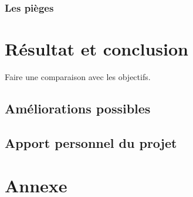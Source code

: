 \documentclass[12pt]{report}
\begin{document}
		\subsection{Les pièges}

\chapter{Résultat et conclusion}

	Faire une comparaison avec les objectifs.
	
	\section{Améliorations possibles}
	
	\section{Apport personnel du projet}

\chapter{Annexe}
\end{document}
